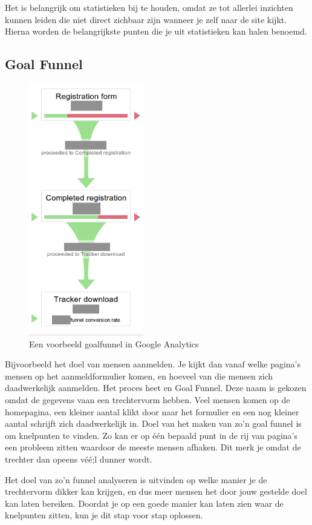 \documentclass[a4paper, 10pt, pdftex]{report}
\begin{document}
    Het is belangrijk om statistieken bij te houden, omdat ze tot allerlei inzichten kunnen leiden die niet direct zichbaar zijn wanneer je zelf naar de site kijkt. Hierna worden de belangrijkste punten die je uit statistieken kan halen benoemd.

    \subsection{Goal Funnel}
      \begin{figure}
      \caption{Een voorbeeld goalfunnel in Google Analytics}
        \includegraphics[width=50mm]{../images/goalfunnel}
    \end{figure}

    Bijvoorbeeld het doel van mensen aanmelden. Je kijkt dan vanaf welke pagina's mensen op het aanmeldformulier komen, en hoeveel van die mensen zich daadwerkelijk aanmelden. Het proces heet en Goal Funnel. Deze naam is gekozen omdat de gegevens vaan een trechtervorm hebben. Veel mensen komen op de homepagina, een kleiner aantal klikt door naar het formulier en een nog kleiner aantal schrijft zich daadwerkelijk in. Doel van het maken van zo'n goal funnel is om knelpunten te vinden. Zo kan er op \'e\'en bepaald punt in de rij van pagina's een probleem zitten waardoor de meeste mensen afhaken. Dit merk je omdat de trechter dan opeens v\'e\'e;l dunner wordt.

    Het doel van zo'n funnel analyseren is uitvinden op welke manier je de trechtervorm dikker kan krijgen, en dus meer mensen het door jouw gestelde doel kan laten bereiken. Doordat je op een goede manier kan laten zien waar de knelpunten zitten, kun je dit stap voor stap oplossen.
\end{document}

